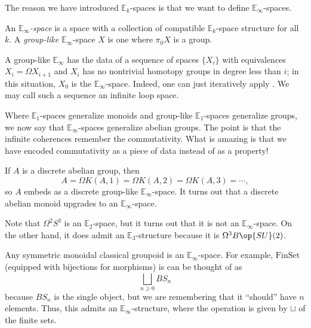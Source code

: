 \documentclass[../notes.tex]{subfiles}
\begin{document}
The reason we have introduced $\mathbb E_k$-spaces is that we want to define $\mathbb E_\infty$-spaces.
\begin{defihelper} 
	An \textit{$\mathbb E_\infty$-space} is a space with a collection of compatible $\mathbb E_k$-space structure for all $k$. A \textit{group-like} $\mathbb E_\infty$-space $X$ is one where $\pi_0X$ is a group.
\end{defihelper}
\begin{remark}
	A group-like $\mathbb E_\infty$ has the data of a sequence of spaces $\{X_i\}$ with equivalences $X_i=\Omega X_{i+1}$ and $X_i$ has no nontrivial homotopy groups in degree less than $i$; in this situation, $X_0$ is the $\mathbb E_\infty$-space. Indeed, one can just iteratively apply . We may call such a sequence an infinite loop space.
\end{remark}
\begin{remark}
	Where $\mathbb E_1$-spaces generalize monoids and group-like $\mathbb E_1$-spaces generalize groups, we now say that $\mathbb E_\infty$-spaces generalize abelian groups. The point is that the infinite coherences remember the commutativity. What is amazing is that we have encoded commutativity as a piece of data instead of as a property!
\end{remark}
\begin{example}
	If $A$ is a discrete abelian group, then
	\[A=\Omega K(A,1)=\Omega K(A,2)=\Omega K(A,3)=\cdots,\]
	so $A$ embeds as a discrete group-like $\mathbb E_\infty$-space. It turns out that a discrete abelian monoid upgrades to an $\mathbb E_\infty$-space.
\end{example}
\begin{nex}
	Note that $\Omega^2S^3$ is an $\mathbb E_2$-space, but it turns out that it is not an $\mathbb E_\infty$-space. On the other hand, it does admit an $\mathbb E_3$-structure because it is $\Omega^3B\op{SU}(2)$.
\end{nex}
\begin{example}
	Any symmetric monoidal classical groupoid is an $\mathbb E_\infty$-space. For example, $\mathrm{FinSet}$ (equip\-ped with bijections for morphisms) is can be thought of as
	\[\bigsqcup_{n\ge0}BS_n\]
	because $BS_n$ is the single object, but we are remembering that it ``should'' have $n$ elements. Thus, this admits an $\mathbb E_\infty$-structure, where the operation is given by $\sqcup$ of the finite sets.
\end{example}
\end{document}
